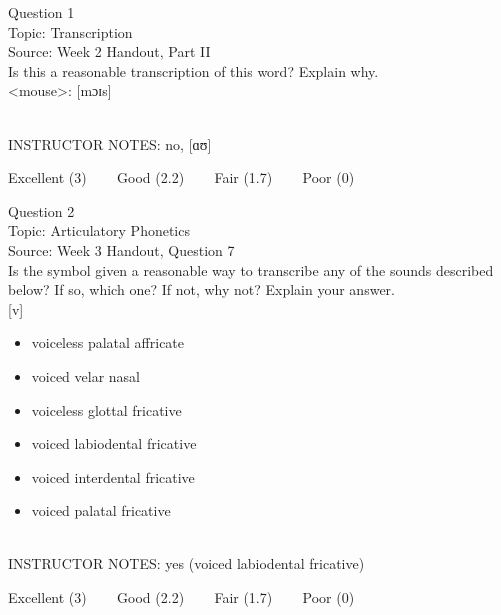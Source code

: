 \documentclass[12pt]{article}
\begin{document}
\begin{center}
\textbf{{\color{blue}{\HUGE START OF EXAM\\}}}

\textbf{{\color{blue}{\HUGE Student ID: 44365\\}}}

\textbf{{\color{blue}{\HUGE \\}}}

\end{center}
\newpage

{\large Question 1}\\

Topic: Transcription\\
Source: Week 2 Handout, Part II\\

Is this a reasonable transcription of this word? Explain why.\\

<mouse>: {[mɔɪs]}


~\\
INSTRUCTOR NOTES: no, [ɑʊ]


\vfill
Excellent (3) ~~~ Good (2.2) ~~~ Fair (1.7) ~~~ Poor (0)
\newpage

{\large Question 2}\\

Topic: Articulatory Phonetics\\
Source: Week 3 Handout, Question 7\\

Is the symbol given a reasonable way to transcribe any of the sounds described below? If so, which one? If not, why not? Explain your answer.\\

{[v]}

\begin{itemize} \item voiceless palatal affricate \item voiced velar nasal \item voiceless glottal fricative \item voiced labiodental fricative \item voiced interdental fricative \item voiced palatal fricative \end{itemize}


~\\
INSTRUCTOR NOTES: yes (voiced labiodental fricative)


\vfill
Excellent (3) ~~~ Good (2.2) ~~~ Fair (1.7) ~~~ Poor (0)
\newpage
\end{document}

